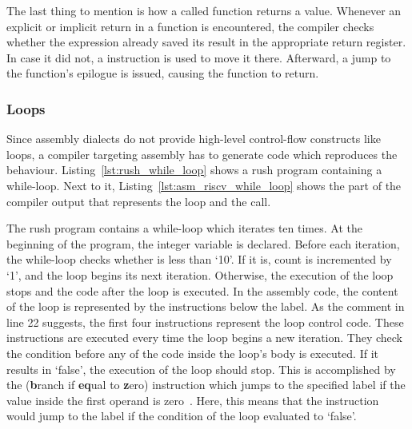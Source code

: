 The last thing to mention is how a called function returns a value.
Whenever an explicit or implicit return in a function is encountered,
the compiler checks whether the expression already saved its result in the appropriate return register.
In case it did not, a  instruction is used to move it there.
Afterward, a jump to the function's epilogue is issued, causing the function to return.

\subsubsection{Loops}

Since assembly dialects do not provide high-level control-flow constructs like loops,
a compiler targeting assembly has to generate code which reproduces the behaviour.
Listing~\ref{lst:rush_while_loop} shows a rush program containing a while-loop.
Next to it, Listing~\ref{lst:asm_riscv_while_loop} shows the part of the compiler output that represents the loop and the  call.

\noindent
\begin{minipage}{.45\textwidth}
	\centering
\end{minipage}%
\hfill
\begin{minipage}{.45\textwidth}
	\centering
	\vspace{.1cm}
\end{minipage}

The rush program contains a while-loop which iterates ten times.
At the beginning of the program, the integer variable  is declared.
Before each iteration, the while-loop checks whether  is less than `10'.
If it is, count is incremented by `1', and the loop begins its next iteration.
Otherwise, the execution of the loop stops and the code after the loop is executed.
In the assembly code, the content of the loop is represented by the instructions below the  label.
As the comment in line 22 suggests, the first four instructions represent the loop control code.
These instructions are executed every time the loop begins a new iteration.
They check the condition before any of the code inside the loop's body is executed.
If it results in `false', the execution of the loop should stop.
This is accomplished by the  (\textbf{b}ranch if \textbf{eq}ual to \textbf{z}ero) instruction which jumps to the specified label if the value inside the first operand is zero~\cite[p.~105]{Waterman2019}.
Here, this means that the instruction would jump to the  label if the condition of the loop evaluated to `false'.

